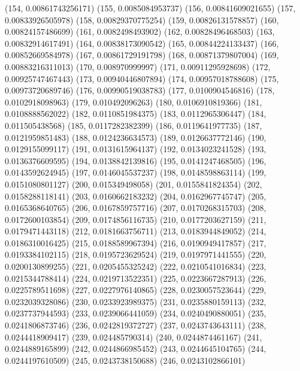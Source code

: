 {					(154, 0.00861743256171)
					(155, 0.0085084953737)
					(156, 0.00841609021655)
					(157, 0.00833926505978)
					(158, 0.00829370775254)
					(159, 0.00826131578857)
					(160, 0.00824157486699)
					(161, 0.0082498493902)
					(162, 0.00828496468503)
					(163, 0.00832914617491)
					(164, 0.00838173090542)
					(165, 0.00844224133437)
					(166, 0.00852669584978)
					(167, 0.00861729191798)
					(168, 0.00871379807004)
					(169, 0.00883216311013)
					(170, 0.008970999997)
					(171, 0.00911295928698)
					(172, 0.00925747467443)
					(173, 0.00940446807894)
					(174, 0.00957018788608)
					(175, 0.00973720689746)
					(176, 0.00990519038783)
					(177, 0.0100904546816)
					(178, 0.0102918098963)
					(179, 0.010492096263)
					(180, 0.0106910819366)
					(181, 0.0108888562022)
					(182, 0.0110851984375)
					(183, 0.0112965306447)
					(184, 0.011505438568)
					(185, 0.0117282382399)
					(186, 0.0119641977735)
					(187, 0.0121959851483)
					(188, 0.0124236634573)
					(189, 0.0126637772146)
					(190, 0.0129155099117)
					(191, 0.0131615964137)
					(192, 0.0134023241528)
					(193, 0.0136376609595)
					(194, 0.0138842139816)
					(195, 0.0141247468505)
					(196, 0.0143592624945)
					(197, 0.0146045537237)
					(198, 0.0148598863114)
					(199, 0.0151080801127)
					(200, 0.015349498058)
					(201, 0.0155841824354)
					(202, 0.0158288118141)
					(203, 0.0160662183232)
					(204, 0.0162967745747)
					(205, 0.0165368640765)
					(206, 0.0167859757716)
					(207, 0.0170268315703)
					(208, 0.0172600103854)
					(209, 0.0174856116735)
					(210, 0.0177203627159)
					(211, 0.0179471443118)
					(212, 0.0181663756711)
					(213, 0.0183944849052)
					(214, 0.0186310016425)
					(215, 0.0188589967394)
					(216, 0.0190949417857)
					(217, 0.0193384102115)
					(218, 0.0195723629524)
					(219, 0.0197971441555)
					(220, 0.0200130899255)
					(221, 0.0205455325242)
					(222, 0.0210541016834)
					(223, 0.0215344788414)
					(224, 0.0219713522351)
					(225, 0.0223667287913)
					(226, 0.0225789511698)
					(227, 0.0227976140865)
					(228, 0.0230057523644)
					(229, 0.0232039328086)
					(230, 0.0233923989375)
					(231, 0.0235880159113)
					(232, 0.0237737944593)
					(233, 0.0239066441059)
					(234, 0.0240490880051)
					(235, 0.0241806873746)
					(236, 0.0242819372727)
					(237, 0.0243743643111)
					(238, 0.0244418909417)
					(239, 0.024485790314)
					(240, 0.0244874461167)
					(241, 0.0244889165899)
					(242, 0.0244866985452)
					(243, 0.0244645104765)
					(244, 0.0244197610509)
					(245, 0.0243738150688)
					(246, 0.0243102866101)
}
